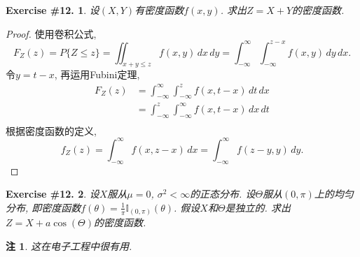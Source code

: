 \documentclass[UTF8, a4paper]{article}
\newtheorem{exercise}{Exercise \#12.}
\newtheorem*{remark}{注}
\begin{document}
\begin{framed}
\begin{exercise}
设\((X,Y)\)有密度函数\(f(x,y)\). 求出\(Z = X+Y\)的密度函数.
\end{exercise}
\end{framed}

\begin{proof}
使用卷积公式, 
$$
F_Z(z) = P\{Z \leq z\} = \iint_{x+y \leq z} f(x,y) \,dx\,dy = \int_{-\infty}^{\infty} \int_{-\infty}^{z-x} f(x,y) \,dy\,dx.
$$
令\(y = t-x\), 再运用Fubini定理,
$$
\begin{aligned}
F_Z(z) &= \int_{-\infty}^{\infty} \int_{-\infty}^{z} f(x, t-x) \,dt\,dx \\
&= \int_{-\infty}^{z} \int_{-\infty}^{\infty} f(x, t-x) \,dx\,dt \\
\end{aligned}
$$
根据密度函数的定义,
$$
f_Z(z) = \int_{-\infty}^{\infty} f(x, z-x) \,dx = \int_{-\infty}^{\infty} f(z-y, y) \,dy.
$$
\end{proof}


\begin{framed}
\begin{exercise}
设\(X\)服从\(\mu = 0\), \(\sigma^2 < \infty\)的正态分布. 
设\(\Theta\)服从\((0 ,\pi)\)上的均匀分布, 即密度函数\(f(\theta) = \frac{1}{\pi}\mathbb{I}_{(0,\pi)}(\theta)\).
假设\(X\)和\(\Theta\)是独立的. 求出\(Z = X+a\cos(\Theta)\)的密度函数.
\end{exercise}
\end{framed}

\begin{remark}
这在电子工程中很有用.
\end{remark}
\end{document}

